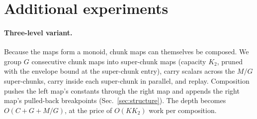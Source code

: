 \documentclass[10pt]{article}
\theoremstyle{remark}
\begin{document}
\begin{table}[!htbp]
\centering\small

\caption{Exact 1-to-1 spike-matching F1 vs.\ many-to-one window F1 (\texttt{max\_pool1d}) on \OneToOneNGFive\ paired Allen cells with official GLIF~1--5 models (Noise~2, E27c). At $\pm 4$\,ms the two metrics agree to three decimals across all models; at $\pm 10$\,ms strict 1-to-1 matching eliminates soft-reset burst double-counting while widening ALIF's lead over both hard LIF and GLIF~5.}
\label{tab:onetoone}
\end{table}

\begin{table}[!htbp]
\centering\scriptsize

\caption{Per-cell results of the Allen Cell Types experiment (part 1); columns as in Table~\ref{tab:allen}.}
\label{tab:allencells1}
\end{table}

\begin{table}[!htbp]
\centering\scriptsize

\caption{Per-cell results of the Allen Cell Types experiment (part 2).}
\label{tab:allencells2}
\end{table}

\section{Additional experiments}
\label{app:moreexp}

\paragraph{Three-level variant.}
Because the maps form a monoid, chunk maps can themselves be composed. We group $G$ consecutive chunk maps into super-chunk maps (capacity $K_2$, pruned with the envelope bound at the super-chunk entry), carry scalars across the $M/G$ super-chunks, carry inside each super-chunk in parallel, and replay. Composition pushes the left map's constants through the right map and appends the right map's pulled-back breakpoints (Sec.~\ref{sec:structure}). The depth becomes $O(C+G+M/G)$, at the price of $O(KK_2)$ work per composition.
\end{document}
